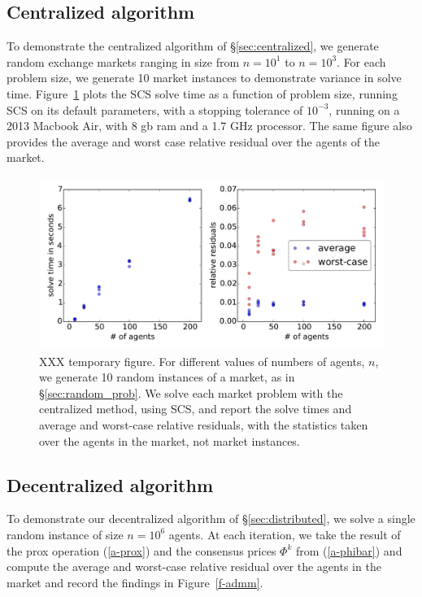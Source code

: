 \documentclass[12pt]{article}
\begin{document}
\subsection{Centralized algorithm}
\label{sec:centralized_examples}
To demonstrate the centralized algorithm of \S\ref{sec:centralized},
we generate random exchange markets ranging in size from $n=10^1$ to $n=10^3$.
For each problem size, we generate 10 market instances to demonstrate variance
in solve time. Figure~\ref{f-cvxpy} plots the SCS solve time as a function of
problem size, running SCS on its default parameters, with a stopping tolerance
of $10^{-3}$, running on a 2013 Macbook Air, with 8 gb ram and a 1.7 GHz
processor. The same figure also provides the average and worst case relative
residual over the agents of the market.


\begin{figure}
\begin{center}
\includegraphics[width=1.0\textwidth]{figures/cvxpy}
\end{center}
\caption{XXX temporary figure. For different values of numbers of agents, $n$,
we generate 10 random instances of a market, as in \S\ref{sec:random_prob}.
We solve each market problem with the centralized method, using SCS, and
report the solve times and average and worst-case relative residuals, with the
statistics taken over the agents in the market, not market instances.}
\label{f-cvxpy}
\end{figure}


\subsection{Decentralized algorithm}

To demonstrate our decentralized algorithm of \S\ref{sec:distributed},
we solve a single random instance of size $n=10^6$ agents. At each iteration,
we take the result of the prox operation (\ref{a-prox}) and the consensus
prices $\Phi^k$ from (\ref{a-phibar}) and compute the average and worst-case
relative residual over the agents in the market and record the findings in
Figure~\ref{f-admm}.
\end{document}
